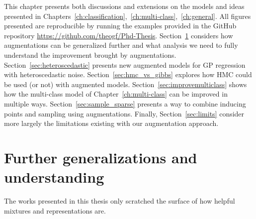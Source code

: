 

\graphicspath{{8/figures/}}
This chapter presents both discussions and extensions on the models and ideas presented in Chapters~\ref{ch:classification},~\ref{ch:multi-class},~\ref{ch:general}.
All figures presented are reproducible by running the examples provided in the GitHub repository \url{https://github.com/theogf/Phd-Thesis}.
Section~\ref{sec:further} considers how augmentations can be generalized further and what analysis we need to fully understand the improvement brought by augmentations.
Section~\ref{sec:heteroscedastic} presents new augmented models for \ac{GP} regression with heteroscedastic noise.
Section~\ref{sec:hmc_vs_gibbs} explores how \ac{HMC} could be used (or not) with augmented models.
Section~\ref{sec:improvemulticlass} shows how the multi-class model of Chapter~\ref{ch:multi-class} can be improved in multiple ways.
Section~\ref{sec:sample_sparse} presents a way to combine inducing points and sampling using augmentations.
Finally, Section~\ref{sec:limits} consider more largely the limitations existing with our augmentation approach.

\section{Further generalizations and understanding}
\label{sec:further}
The works presented in this thesis only scratched the surface of how helpful mixtures and representations are.
